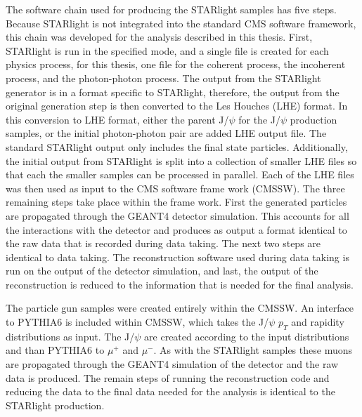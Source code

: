     The software chain used for producing the STARlight samples has five steps.
    Because STARlight is not integrated into the standard CMS software 
      framework, this chain was developed for the analysis described in this
      thesis.
    First, STARlight is run in the specified mode, and a single file is 
      created for each physics process, for this thesis, one file for the 
      coherent process, the incoherent process, and the photon-photon process.
    The output from the STARlight generator is in a format specific to 
      STARlight, therefore, the output from the original generation step is 
      then converted to the Les Houches (LHE) format. 
    In this conversion to LHE format, either the parent J/$\psi$ for the 
      J/$\psi$ production samples, or the initial photon-photon pair are added
      LHE output file.
    The standard STARlight output only includes the final state particles.
    Additionally, the initial output from STARlight is split into a collection 
      of smaller LHE files so that each the smaller samples can be 
      processed in parallel.
    Each of the LHE files was then used as input to the CMS software frame work
      (CMSSW).
    The three remaining steps take place within the frame work. 
    First the generated particles are propagated through the GEANT4 detector 
      simulation.
    This accounts for all the interactions with the detector and produces as 
      output a format identical to the raw data that is recorded during data
      taking.
    The next two steps are identical to data taking.
    The reconstruction software used during data taking is run on the output 
      of the detector simulation, and last, the output of the reconstruction
      is reduced to the information that is needed for the final analysis.

    The particle gun samples were created entirely within the CMSSW.
    An interface to PYTHIA6 is included within CMSSW, which takes the J/$\psi$
      $p_{T}$ and rapidity distributions as input. 
    The J/$\psi$ are created according to the input distributions and than 
      PYTHIA6 to $\mu^{+}$ and $\mu^{-}$.
    As with the STARlight samples these muons are propagated through the GEANT4
      simulation of the detector and the raw data is produced.
    The remain steps of running the reconstruction code and reducing the 
      data to the final data needed for the analysis is identical to the 
      STARlight production.

